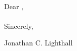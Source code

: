 \clearpage
\pagestyle{empty}
\nameaddress{\homeaddress}
\vspace*{1.0\baselineskip}%

\vspace*{2.0\baselineskip}%
\recip{}\\
\recipaddress{}
\vspace*{2.0\baselineskip}%

Dear \recip,\\

\\

Sincerely, 

\vspace*{2.0\baselineskip}%

Jonathan C. Lighthall